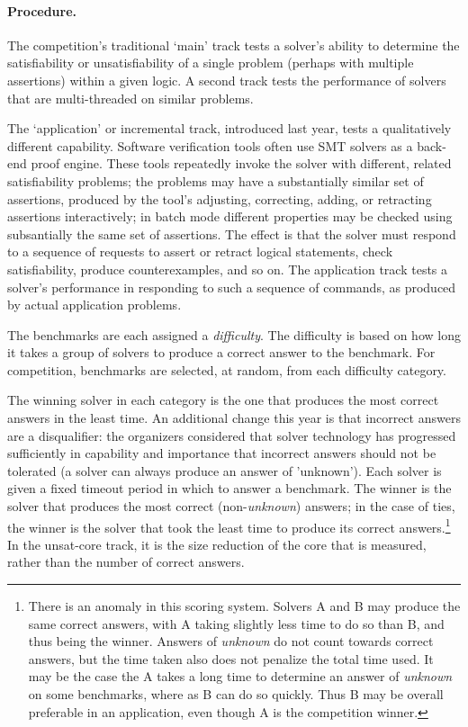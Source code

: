 \documentclass{llncs}
\begin{document}
\paragraph{Procedure.} 

The competition's traditional `main' track tests a solver's ability to determine the satisfiability or unsatisfiability of a single problem (perhaps with multiple assertions) within a given logic. A second track tests the performance of solvers that are multi-threaded on similar problems.

The `application' or incremental track, introduced last year, tests a qualitatively different capability. Software verification tools often use SMT solvers as a back-end proof engine. These tools repeatedly invoke the solver with different, related satisfiability problems; the problems may have a substantially similar set of assertions, produced by the tool's adjusting, correcting, adding, or retracting assertions interactively; in batch mode different properties may be checked using subsantially the same set of assertions.
The effect is that the solver must respond to a sequence of requests to assert or retract logical statements, check satisfiability, produce counterexamples, and so on. The application track tests a solver's performance in responding to such a sequence of commands, as produced by actual application problems.

The benchmarks are each assigned a {\em difficulty}. The difficulty is based on how long it takes a group of solvers to produce a correct answer to the benchmark. For competition, benchmarks are selected, at random, from each difficulty category. 

The winning solver in each category is the one that produces the most correct answers in the least time. An additional change this year is that incorrect answers are a disqualifier: the organizers considered that solver technology has progressed sufficiently in capability and importance that incorrect answers should not be tolerated (a solver can always produce an answer of 'unknown'). Each solver is given a fixed timeout period in which to answer a benchmark. The winner is the solver that produces the most correct (non-{\em unknown}) answers; in the case of ties, the winner is the solver that took the least time to produce its correct answers.\footnote{There is an anomaly in this scoring system. Solvers A and B may produce the same correct answers, with A taking slightly less time to do so than B, and thus being the winner. Answers of {\em unknown} do not count towards correct answers, but the time taken also does not penalize the total time used. It may be the case the A takes a long time to determine an answer of {\em unknown} on some benchmarks, where as B can do so quickly. Thus B may be overall preferable in an application, even though A is the competition winner.}
In the unsat-core track, it is the size reduction of the core that is measured, rather than the number of correct answers.
\end{document}
